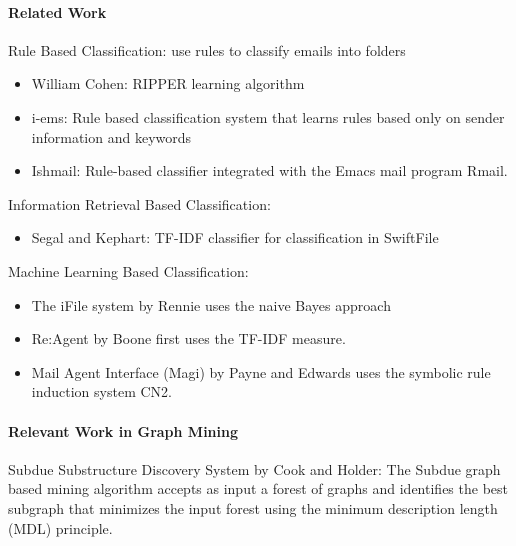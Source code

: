 \documentclass[12pt]{article}
\newenvironment{my_itemize}
{\begin{itemize}
  \setlength{\itemsep}{0cm}
  \setlength{\parskip}{0cm}}
{\end{itemize}}
\begin{document}
\paragraph{Related Work}
\begin{my_itemize}
 \item Rule Based Classification: use rules to classify emails into folders
 \begin{itemize}
  \item William Cohen: RIPPER learning algorithm
  \item i-ems: Rule based classification system that learns rules based only on sender information and keywords
  \item Ishmail: Rule-based classifier integrated with the Emacs mail program Rmail.
 \end{itemize}


 \item Information Retrieval Based Classification:
 \begin{itemize}
  \item Segal and Kephart: TF-IDF classifier for classification in SwiftFile
 \end{itemize}

 \item Machine Learning Based Classification:
 \begin{itemize}
  \item The iFile system by Rennie uses the naive Bayes approach
  \item Re:Agent by Boone first uses the TF-IDF measure.
  \item Mail Agent Interface (Magi) by Payne and Edwards uses the symbolic rule induction system CN2.
 \end{itemize}
\end{my_itemize}

\paragraph{Relevant Work in Graph Mining}
\begin{my_itemize}
 \item Subdue Substructure Discovery System by Cook and Holder:
The Subdue graph based mining algorithm accepts as input a forest of graphs and identifies the best subgraph that minimizes the input forest using the minimum description length (MDL) principle. 
\end{my_itemize}
\end{document}

